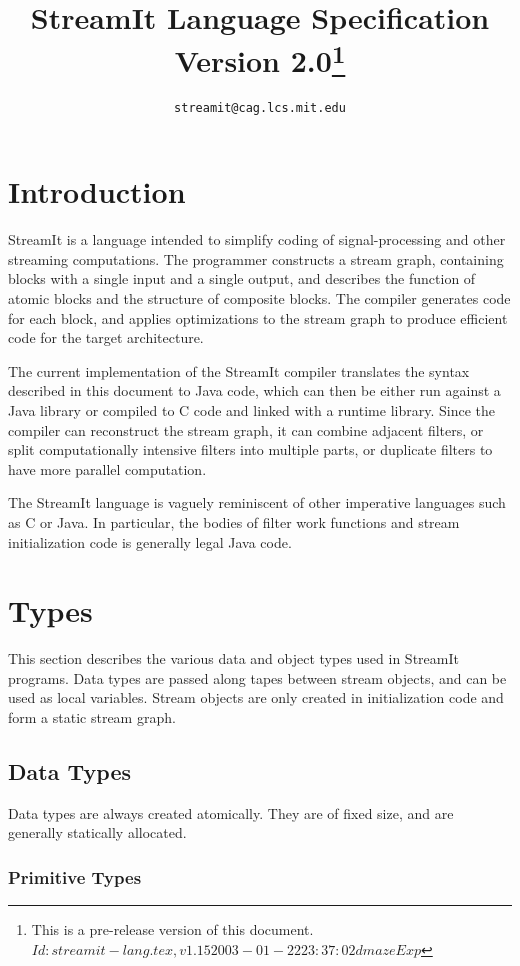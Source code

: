 \documentclass[11pt]{article}
\title{StreamIt Language Specification\\
Version 2.0\ifprerel\thanks{
This is a pre-release version of this document.\hfil\break\ttfamily
\hbox{$Id: streamit-lang.tex,v 1.15 2003-01-22 23:37:02 dmaze Exp $}
}\fi}
\author{\texttt{streamit@cag.lcs.mit.edu}}
\begin{document}
\maketitle
\tableofcontents

\section{Introduction}

StreamIt is a language intended to simplify coding of
signal-processing and other streaming computations.  The programmer
constructs a stream graph, containing blocks with a single input and a
single output, and describes the function of atomic blocks and the
structure of composite blocks.  The compiler generates code for each
block, and applies optimizations to the stream graph to produce
efficient code for the target architecture.

The current implementation of the StreamIt compiler translates the
syntax described in this document to Java code, which can then be
either run against a Java library or compiled to C code and linked
with a runtime library.  Since the compiler can reconstruct the stream
graph, it can combine adjacent filters, or split computationally
intensive filters into multiple parts, or duplicate filters to have
more parallel computation.

The StreamIt language is vaguely reminiscent of other imperative
languages such as C or Java.  In particular, the bodies of filter work
functions and stream initialization code is generally legal Java
code.

\section{Types}

This section describes the various data and object types used in
StreamIt programs.  Data types are passed along tapes between stream
objects, and can be used as local variables.  Stream objects are only
created in initialization code and form a static stream graph.

\subsection{Data Types}

Data types are always created atomically.  They are of fixed size, and
are generally statically allocated.

\subsubsection{Primitive Types}
\end{document}
